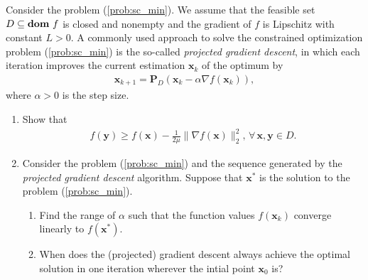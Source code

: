 \documentclass[11pt,letter,notitlepage]{article}
\DeclareMathOperator*{\dom}{\bf dom\,}
\newcommand{\proj}[2]{\textbf{P}_{#2} (#1)}
\begin{document}
\begin{exercise}
    Consider the problem (\ref{prob:sc_min}). We assume that the feasible set $D \subseteq \dom f$ is closed and nonempty and the gradient of $f$ is Lipschitz with constant $L>0$. A commonly used approach to solve the constrained optimization problem (\ref{prob:sc_min}) is the so-called \emph{projected gradient descent}, in which each iteration improves the current estimation $\mathbf{x}_k$ of the optimum by
    \begin{align*}
        \mathbf{x}_{k+1}=\proj{\mathbf{x}_k-\alpha\nabla f(\mathbf{x}_k)}{D},
    \end{align*}
    where $\alpha>0$ is the step size.
    \begin{enumerate}
        \item Show that
        \begin{align*}
            f(\mathbf{y})\ge f(\mathbf{x})-\frac{1}{2\mu}\|\nabla f(\mathbf{x})\|_2^2, \,\forall\, \mathbf{x},\mathbf{y} \in D.
        \end{align*}
        \item Consider the problem (\ref{prob:sc_min}) and the sequence generated by the \emph{projected gradient descent} algorithm. Suppose that $\mathbf{x}^*$ is the solution to the problem (\ref{prob:sc_min}).
        \begin{enumerate}
            \item Find the range of $\alpha$ such that the function values $f(\mathbf{x}_k)$ converge linearly to $f(\mathbf{x}^*)$.
            \item When does the (projected) gradient descent always achieve the optimal solution in one iteration wherever the intial point $\mathbf{x}_0$ is?
        \end{enumerate}
    \end{enumerate}
\end{exercise}

\begin{solution}

\end{solution}

\newpage
\end{document}
